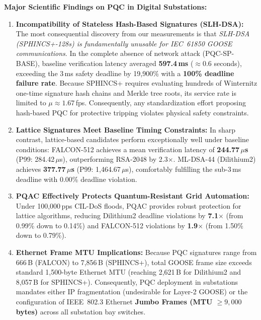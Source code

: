 \documentclass{ieeeaccess}
\begin{document}
\textbf{Major Scientific Findings on PQC in Digital Substations:}
\begin{enumerate}[leftmargin=*]
    \item \textbf{Incompatibility of Stateless Hash-Based Signatures (SLH-DSA):} The most consequential discovery from our measurements is that \emph{SLH-DSA (SPHINCS+-128s) is fundamentally unusable for IEC~61850 GOOSE communications}. In the complete absence of network attack (PQC-SP-BASE), baseline verification latency averaged \textbf{597.4\,ms} ($\approx$0.6 seconds), exceeding the 3\,ms safety deadline by 19,900\% with a \textbf{100\% deadline failure rate}. Because SPHINCS+ requires evaluating hundreds of Winternitz one-time signature hash chains and Merkle tree roots, its service rate is limited to $\mu \approx 1.67$\,fps. Consequently, any standardization effort proposing hash-based PQC for protective tripping violates physical safety constraints.
    \item \textbf{Lattice Signatures Meet Baseline Timing Constraints:} In sharp contrast, lattice-based candidates perform exceptionally well under baseline conditions: FALCON-512 achieves a mean verification latency of \textbf{244.77\,$\mu$s} (P99: 284.42\,$\mu$s), outperforming RSA-2048 by 2.3$\times$. ML-DSA-44 (Dilithium2) achieves \textbf{377.77\,$\mu$s} (P99: 1,464.67\,$\mu$s), comfortably fulfilling the sub-3\,ms deadline with 0.00\% deadline violation.
    \item \textbf{PQAC Effectively Protects Quantum-Resistant Grid Automation:} Under 100,000\,pps CIL-DoS floods, PQAC provides robust protection for lattice algorithms, reducing Dilithium2 deadline violations by \textbf{7.1$\times$} (from 0.99\% down to 0.14\%) and FALCON-512 violations by \textbf{1.9$\times$} (from 1.50\% down to 0.79\%).
    \item \textbf{Ethernet Frame MTU Implications:} Because PQC signatures range from 666\,B (FALCON) to 7,856\,B (SPHINCS+), total GOOSE frame size exceeds standard 1,500-byte Ethernet MTU (reaching 2,621\,B for Dilithium2 and 8,057\,B for SPHINCS+). Consequently, PQC deployment in substations mandates either IP fragmentation (undesirable for Layer-2 GOOSE) or the configuration of IEEE~802.3 Ethernet \textbf{Jumbo Frames (MTU $\ge 9{,}000$\,bytes)} across all substation bay switches.
\end{enumerate}

\end{document}

